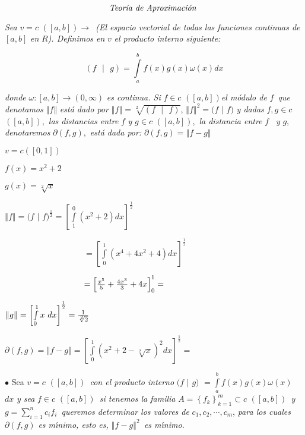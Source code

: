 \documentclass{article}
\begin{document}
\[
\text{\emph{Teor\'{\i}a de Aproximaci\'{o}n}}\mathit{\ } 
\]

\textit{Sea }$v=c$ $(\left[ a,b\right] )\rightarrow $\textit{\ (El espacio
vectorial de todas las funciones continuas de }$\left[ a,b\right] $ \textit{%
en }$R$\textit{). Definimos en }$v$ \textit{el producto interno siguiente:}

\[
(f\text{ }|\text{ }g)=\int\limits_{a}^{b}f(x)g(x)\omega (x)dx 
\]

\textit{donde }$\omega :\left[ a,b\right] \rightarrow \left( 0,\infty
\right) $ \textit{es continua. Si }$f\in c$ $(\left[ a,b\right] )$\textit{el
m\'{o}dulo de }$f$\textit{\ que denotamos }$\left\Vert f\right\Vert $ 
\textit{est\'{a} dado por }$\left\Vert f\right\Vert =\sqrt[2]{(f\text{ }|%
\text{ }f)}$, $\left\Vert f\right\Vert ^{2}=(f$ $|$ $f)$ \textit{y dadas }$%
f,g\in c$ $(\left[ a,b\right] )$,\textit{\ las distancias entre }$f$ \textit{%
y }$g\in c$ $(\left[ a,b\right] )$,\textit{\ la distancia entre }$f$\textit{%
\ y }$g$, \textit{denotaremos }$\partial (f,g)$,\textit{\ est\'{a} dada por: 
}$\partial (f,g)=\left\Vert f-g\right\Vert $


$v=c(\left[ 0,1\right] )$

$f(x)=x^{2}+2$

$g(x)=\sqrt[2]{x}$

$\left\Vert f\right\Vert =(f$ $|$ $f)^{\frac{1}{2}}=\left[
\int\limits_{1}^{0}(x^{2}+2)dx\right] ^{\frac{1}{2}}$

\ \ \ \ \ \ \ \ \ \ \ \ \ \ \ \ \ \ \ $=\left[ \int%
\limits_{0}^{1}(x^{4}+4x^{2}+4)dx\right] ^{\frac{1}{2}}$

\ \ \ \ \ \ \ \ \ \ \ \ \ \ \ \ \ \ \ $=\left[ \frac{x^{5}}{5}+\frac{4x^{3}}{%
3}+4x\right] _{0}^{1}=$

$\left\Vert g\right\Vert =\left[ \int\limits_{0}^{1}x\text{ }dx\right] ^{%
\frac{1}{2}}=\frac{1}{\sqrt[2]{2}}$

$\partial (f,g)=\left\Vert f-g\right\Vert =\left[ \int%
\limits_{0}^{1}(x^{2}+2-\sqrt[2]{x})^{2}dx\right] ^{\frac{1}{2}}=$

$\bullet $ Sea $v=c$ $(\left[ a,b\right] )$\textit{\ con el producto interno}%
$(f$ $|$ $g)$ $=\int\limits_{a}^{b}f(x)g(x)\omega (x)$ $dx$ \textit{y sea }$%
f\in c$ $(\left[ a,b\right] )$\textit{\ si tenemos la familia }$A=\left\{
f_{k}\right\} _{k=1}^{m}\subset c$ $(\left[ a,b\right] )$\textit{\ y }$%
g=\sum\limits_{i=1}^{n}c_{i}f_{i}$\textit{\ queremos determinar los valores
de }$c_{1},c_{2},\cdots ,c_{m}$, \textit{para los cuales }$\partial (f,g)$ 
\textit{es m\'{\i}nimo, esto es, }$\left\Vert f-g\right\Vert ^{2}$\textit{\
es m\'{\i}nimo.}
\end{document}
